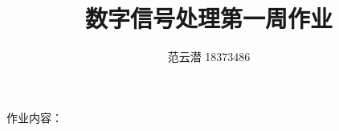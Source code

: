 \documentclass[lang=cn,11pt,a4paper,cite=authoryear]{elegantpaper}
\title{数字信号处理\quad 第一周作业}
\author{范云潜 18373486}
\institute{微电子学院 184111 班}
\date{\zhtoday}
\begin{document}
\maketitle

作业内容：

\tableofcontents


\end{document}
